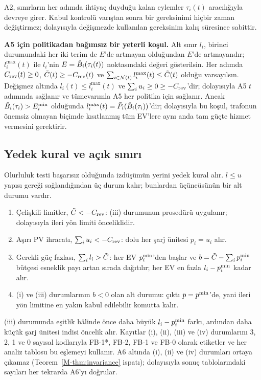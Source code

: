 A2, sınırların her adımda ihtiyaç duyduğu kalan eylemler $\tau_i(t)$ aracılığıyla devreye girer.
Kabul kontrolü varıştan sonra bir gereksinimi hiçbir zaman değiştirmez; dolayısıyla değişmezde kullanılan gereksinim kalış süresince sabittir.

\textbf{A5 için politikadan bağımsız bir yeterli koşul.}
Alt sınır $l_i$, birinci durumundaki her iki terim de $E$'de artmayan olduğundan $E$'de artmayandır; $l_i^{\max}(t)$ ile $l_i$'nin $E=\hat B_i(\tau_i(t))$ noktasındaki değeri gösterilsin.
Her adımda $C_{\mathrm{rev}}(t)\ge0$, $\tilde C(t)\ge-C_{\mathrm{rev}}(t)$ ve $\sum_{i\in\mathcal N(t)}l_i^{\max}(t)\le\tilde C(t)$ olduğu varsayılsın.
Değişmez altında $l_i(t)\le l_i^{\max}(t)$ ve $\sum_iu_i\ge0\ge-C_{\mathrm{rev}}$'dir; dolayısıyla A5 $t$ adımında sağlanır ve tümevarımla A5 her politika için sağlanır.
Ancak $\hat B_i(\tau_i)>E_i^{\min}$ olduğunda $l_i^{\max}(t)=\bar P_i(\hat B_i(\tau_i))$'dir; dolayısıyla bu koşul, trafonun önemsiz olmayan biçimde kısıtlanmış tüm EV'lere aynı anda tam güçte hizmet vermesini gerektirir.

\subsection{Yedek kural ve açık sınırı}\label{app:fallback}

Olurluluk testi başarısız olduğunda izdüşümün yerini yedek kural alır.
$l\le u$ yapısı gereği sağlandığından üç durum kalır; bunlardan üçüncüsünün bir alt durumu vardır.
\begin{enumerate}
\item[(i)] Çelişkili limitler, $\tilde C<-C_{\mathrm{rev}}$: (iii) durumunun prosedürü uygulanır; dolayısıyla ileri yön limiti önceliklidir.
\item[(ii)] Aşırı PV ihracatı, $\sum_iu_i<-C_{\mathrm{rev}}$: dolu her şarj ünitesi $p_i=u_i$ alır.
\item[(iii)] Gerekli güç fazlası, $\sum_il_i>\tilde C$: her EV $p^{\min}_i$'den başlar ve $b=\tilde C-\sum_ip^{\min}_i$ bütçesi esneklik payı artan sırada dağıtılır; her EV en fazla $l_i-p^{\min}_i$ kadar alır.
\item[(iv)] (i) ve (iii) durumlarının $b<0$ olan alt durumu: çıktı $p=p^{\min}$'de, yani ileri yön limitine en yakın kabul edilebilir komutta kalır.
\end{enumerate}
(iii) durumunda eşitlik hâlinde önce daha büyük $l_i-p^{\min}_i$ farkı, ardından daha küçük şarj ünitesi indisi öncelik alır.
Kayıtlar (i), (ii), (iii) ve (iv) durumlarını 3, 2, 1 ve 0 sayısal kodlarıyla FB-1*, FB-2, FB-1 ve FB-0 olarak etiketler ve her analiz tablosu bu eşlemeyi kullanır.
A6 altında (i), (ii) ve (iv) durumları ortaya çıkamaz (Teorem~\ref{M-thm:invariance} ispatı); dolayısıyla sonuç tablolarındaki sayıları her tekrarda A6'yı doğrular.

